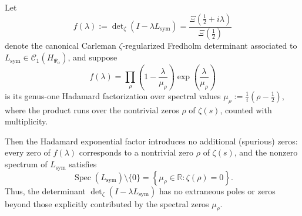 \begin{lemma}
\label{lem:no_extraneous_zeros}
Let
\[
f(\lambda) := \det\nolimits_\zeta(I - \lambda L_{\mathrm{sym}}) = \frac{\Xi(\tfrac{1}{2} + i\lambda)}{\Xi(\tfrac{1}{2})}
\]
denote the canonical Carleman \(\zeta\)-regularized Fredholm determinant associated to \( L_{\mathrm{sym}} \in \mathcal{C}_1(H_{\Psi_\alpha}) \), and suppose
\[
f(\lambda) = \prod_{\rho} \left(1 - \frac{\lambda}{\mu_\rho} \right) \exp\left( \frac{\lambda}{\mu_\rho} \right)
\]
is its genus-one Hadamard factorization over spectral values \( \mu_\rho := \frac{1}{i}(\rho - \tfrac{1}{2}) \), where the product runs over the nontrivial zeros \( \rho \) of \( \zeta(s) \), counted with multiplicity.

Then the Hadamard exponential factor introduces no additional (spurious) zeros: every zero of \( f(\lambda) \) corresponds to a nontrivial zero \( \rho \) of \( \zeta(s) \), and the nonzero spectrum of \( L_{\mathrm{sym}} \) satisfies
\[
\operatorname{Spec}(L_{\mathrm{sym}}) \setminus \{0\} = \left\{ \mu_\rho \in \mathbb{R} : \zeta(\rho) = 0 \right\}.
\]
Thus, the determinant \( \det\nolimits_\zeta(I - \lambda L_{\mathrm{sym}}) \) has no extraneous poles or zeros beyond those explicitly contributed by the spectral zeros \( \mu_\rho \).
\end{lemma}
